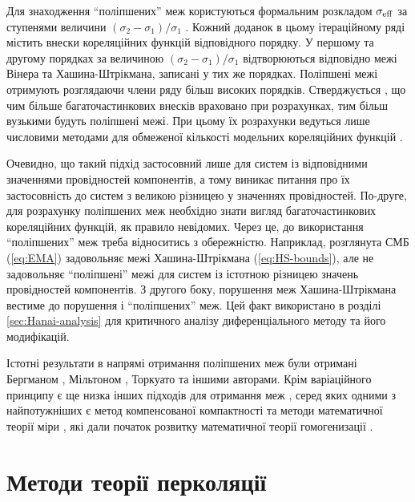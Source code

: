 \documentclass[14pt,twoside]{vakthesis}
\begin{document}
Для знаходження ``поліпшених'' меж користуються формальним розкладом $\sigma_{\rm eff}$ за ступенями величини $(\sigma_2-\sigma_1)/\sigma_1$ \cite{Torquato1991,Torquato}. Кожний доданок в цьому ітераційному ряді містить внески кореляційних функцій відповідного порядку. У першому та другому порядках за величиною $(\sigma_2-\sigma_1)/\sigma_1$ відтворюються відповідно межі Вінера та Хашина-Штрікмана, записані у тих же порядках. Поліпшені межі отримують розглядаючи члени ряду більш високих порядків.  Стверджується \cite{Torquato}, що чим більше багаточастинкових внесків враховано при розрахунках, тим більш вузькими будуть поліпшені межі. При цьому їх розрахунки ведуться лише числовими методами для обмеженої кількості модельних кореляційних функцій \cite{Cule1999}. 

Очевидно, що такий підхід застосовний лише для систем із відповідними значеннями провідностей компонентів, а тому виникає питання про їх застосовність до систем з великою різницею у значеннях провідностей. По-друге, для розрахунку поліпшених меж необхідно знати вигляд багаточастинкових кореляційних функцій, як правило невідомих. 
Через це, до використання ``поліпшених'' меж треба відноситись з обережністю. 
Наприклад, розглянута СМБ (\ref{eq:EMA}) задовольняє межі Хашина-Штрік\-мана (\ref{eq:HS-bounds}), але не задовольняє ``поліпшені'' межі \cite{Torquato} для систем із істотною різницею значень провідностей компонентів. З другого боку, порушення меж Хашина-Штрікмана вестиме до порушення і ``поліпшених'' меж. Цей факт використано в розділі \ref{sec:Hanai-analysis} для критичного аналізу диференціального методу та його модифікацій.

Істотні результати в напрямі отримання поліпшених меж були отримані Бергманом \cite{Bergman1978,Bergman1992}, Мільтоном \cite{Milton}, Торкуато \cite{Torquato1991,Torquato} та іншими авторами. Крім варіаційного принципу є ще низка інших підходів для отримання меж \cite{Milton,Torquato,Sihvola1999,Cioranescu,Jikov}, серед яких одними з найпотужніших є метод компенсованої компактності \cite{Tartar1979,Milton} та методи математичної теорії міри  \cite{Tartar1990}, які дали початок розвитку математичної теорії гомогенизації \cite{Cioranescu,Jikov}.


\section{Методи теорії перколяції}\label{sec:perc}
 
\end{document}
